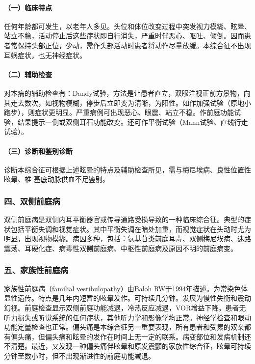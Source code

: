 \paragraph{（一）临床特点}

任何年龄都可发生，以老年人多见。头位和体位改变过程中突发视力模糊、眩晕、站立不稳，活动停止后这些症状即自行消失，严重时伴恶心、呕吐、倾倒。因而患者常保持头部正位，少动，需作头部活动时患者将动作尽量放缓。本综合征不出现耳蜗症状，也无神经症状。

\paragraph{（二）辅助检查}

对本病的辅助检查有：Dandy试验，方法是让患者直立，双眼注视正前方景物，向其走去数次，如视物模糊，停步后立即变为清晰，为阳性。如作加强试验（原地小跑步），则症状更明显。严重病例可出现恶心、眼震、站立不稳。作前庭功能试验，结果提示一侧或双侧耳石功能改变。还可作平衡试验（Mann试验、直线行走试验）。

\paragraph{（三）诊断和鉴别诊断}

诊断本综合征可根据上述眩晕的特点及辅助检查所见，需与梅尼埃病、良性位置性眩晕、椎-基底动脉供血不足鉴别。

\subsubsection{四、双侧前庭病}

双侧前庭病是双侧内耳平衡器官或传导通路受损导致的一种临床综合征。典型的症状包括平衡失调和视觉症状。其中平衡失调在暗处加重，而视觉症状在头动时尤为明显，出现视物模糊。病因多种，包括：氨基苷类前庭耳毒、双侧梅尼埃病、迷路震荡、耳硬化症、病毒性双侧前庭病、中枢性前庭病及原因不明的前庭病变。

\subsubsection{五、家族性前庭病}

家族性前庭病（familial vestibulopathy）由Baloh
RW于1994年描述。为常染色体显性遗传。特点是几年内短暂的眩晕发作。可持续几分钟。发展为慢性失衡和震动幻视。前庭检查显示双侧前庭功能减退，冷热反应减退，VOR增益下降。患者无听力损失或听觉系统的任何症状，其他听力学和影像学均正常。神经学检查和眼动功能定量检查也正常。偏头痛是本综合征另一重要表现，所有患者和受累的双亲都有偏头痛，但偏头痛和眩晕的发作在时间上无一定的联系。病变部位和发病机制还不清楚。最近，又发现一种偏头痛伴眩晕和原发震颤的家族性综合征，眩晕可持续分钟至数小时，但不出现渐进性的前庭功能减退。

